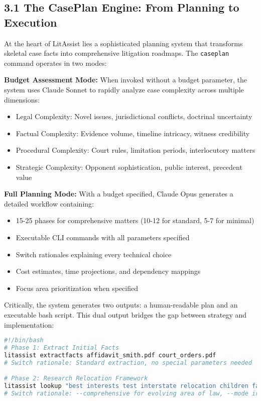 \documentclass[12pt,a4paper]{article}
\begin{document}
\subsection*{3.1 The CasePlan Engine: From Planning to Execution}

At the heart of LitAssist lies a sophisticated planning system that transforms skeletal case facts into comprehensive litigation roadmaps. The \texttt{caseplan} command operates in two modes:

\textbf{Budget Assessment Mode:} When invoked without a budget parameter, the system uses Claude Sonnet to rapidly analyze case complexity across multiple dimensions:
\begin{itemize}
\item Legal Complexity: Novel issues, jurisdictional conflicts, doctrinal uncertainty
\item Factual Complexity: Evidence volume, timeline intricacy, witness credibility
\item Procedural Complexity: Court rules, limitation periods, interlocutory matters
\item Strategic Complexity: Opponent sophistication, public interest, precedent value
\end{itemize}

\textbf{Full Planning Mode:} With a budget specified, Claude Opus generates a detailed workflow containing:
\begin{itemize}
\item 15-25 phases for comprehensive matters (10-12 for standard, 5-7 for minimal)
\item Executable CLI commands with all parameters specified
\item Switch rationales explaining every technical choice
\item Cost estimates, time projections, and dependency mappings
\item Focus area prioritization when specified
\end{itemize}

Critically, the system generates two outputs: a human-readable plan and an executable bash script. This dual output bridges the gap between strategy and implementation:

\begin{lstlisting}[language=bash, caption=Executable CasePlan Output]
#!/bin/bash
# Phase 1: Extract Initial Facts
litassist extractfacts affidavit_smith.pdf court_orders.pdf
# Switch rationale: Standard extraction, no special parameters needed

# Phase 2: Research Relocation Framework  
litassist lookup "best interests test interstate relocation children family law" --mode irac --comprehensive
# Switch rationale: --comprehensive for evolving area of law, --mode irac for structured submission format
\end{lstlisting}
\end{document}
